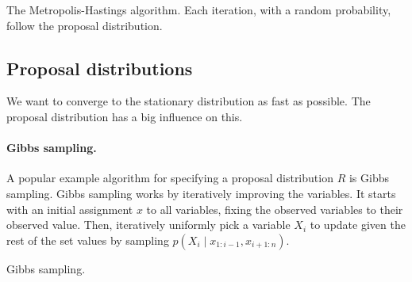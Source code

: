 \begin{algorithm}
    \caption{The Metropolis-Hastings algorithm. Each iteration, with a random
        probability, follow the proposal distribution.}

    \begin{algorithmic}[1]
        \EndIf
        \EndFor
        \EndFunction
    \end{algorithmic}
\end{algorithm}

\subsection{Proposal distributions}

We want to converge to the stationary distribution as fast as possible. The
proposal distribution has a big influence on this.

\paragraph{Gibbs sampling.}

A popular example algorithm for specifying a proposal distribution $R$ is
Gibbs sampling. Gibbs sampling works by iteratively improving the variables.
It starts with an initial assignment $x$ to all variables, fixing the
observed variables to their observed value. Then, iteratively uniformly pick
a variable $X_i$ to update given the rest of the set values by sampling
$p(X_i \mid x_{1:i-1}, x_{i+1:n})$.

\begin{algorithm}
    \caption{Gibbs sampling.}

    \begin{algorithmic}[1]
        \EndFor
        \EndFunction
    \end{algorithmic}
\end{algorithm}

